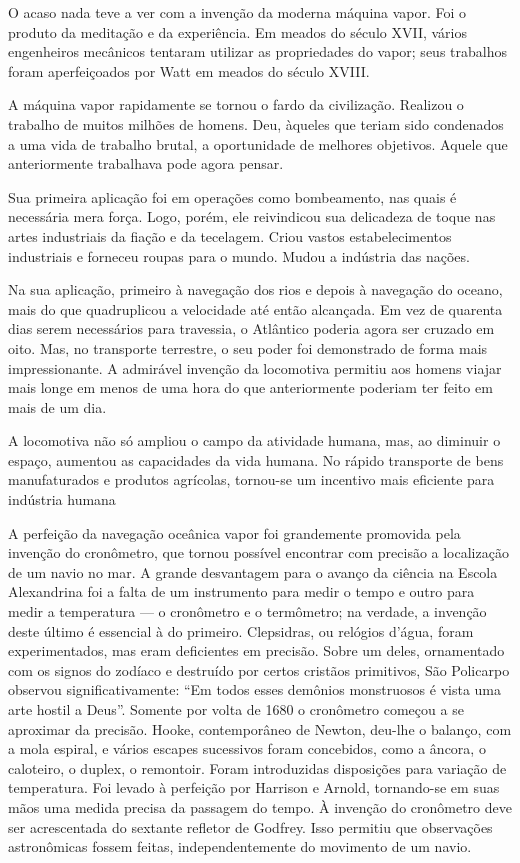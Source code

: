 \documentclass[11pt,a5paper,twoside,openany]{book}
\begin{document}
O acaso nada teve a ver com a invenção da moderna máquina vapor. Foi o produto da meditação e da experiência. Em meados do século XVII, vários engenheiros mecânicos tentaram utilizar as propriedades do vapor; seus trabalhos foram aperfeiçoados por Watt em meados do século XVIII.

A máquina vapor rapidamente se tornou o fardo da civilização. Realizou o trabalho de muitos milhões de homens. Deu, àqueles que teriam sido condenados a uma vida de trabalho brutal, a oportunidade de melhores objetivos. Aquele que anteriormente trabalhava pode agora pensar.

Sua primeira aplicação foi em operações como bombeamento, nas quais é necessária mera força. Logo, porém, ele reivindicou sua delicadeza de toque nas artes industriais da fiação e da tecelagem. Criou vastos estabelecimentos industriais e forneceu roupas para o mundo. Mudou a indústria das nações.

Na sua aplicação, primeiro à navegação dos rios e depois à navegação do oceano, mais do que quadruplicou a velocidade até então alcançada. Em vez de quarenta dias serem necessários para travessia, o Atlântico poderia agora ser cruzado em oito. Mas, no transporte terrestre, o seu poder foi demonstrado de forma mais impressionante. A admirável invenção da locomotiva permitiu aos homens viajar mais longe em menos de uma hora do que anteriormente poderiam ter feito em mais de um dia.

A locomotiva não só ampliou o campo da atividade humana, mas, ao diminuir o espaço, aumentou as capacidades da vida humana. No rápido transporte de bens manufaturados e produtos agrícolas, tornou-se um incentivo mais eficiente para indústria humana

A perfeição da navegação oceânica vapor foi grandemente promovida pela invenção do cronômetro, que tornou possível encontrar com precisão a localização de um navio no mar. A grande desvantagem para o avanço da ciência na Escola Alexandrina foi a falta de um instrumento para medir o tempo e outro para medir a temperatura — o cronômetro e o termômetro; na verdade, a invenção deste último é essencial à do primeiro. Clepsidras, ou relógios d'água, foram experimentados, mas eram deficientes em precisão. Sobre um deles, ornamentado com os signos do zodíaco e destruído por certos cristãos primitivos, São Policarpo observou significativamente: “Em todos esses demônios monstruosos é vista uma arte hostil a Deus”. Somente por volta de 1680 o cronômetro começou a se aproximar da precisão. Hooke, contemporâneo de Newton, deu-lhe o balanço, com a mola espiral, e vários escapes sucessivos foram concebidos, como a âncora, o caloteiro, o duplex, o remontoir. Foram introduzidas disposições para variação de temperatura. Foi levado à perfeição por Harrison e Arnold, tornando-se em suas mãos uma medida precisa da passagem do tempo. À invenção do cronômetro deve ser acrescentada do sextante refletor de Godfrey. Isso permitiu que observações astronômicas fossem feitas, independentemente do movimento de um navio.
\end{document}
